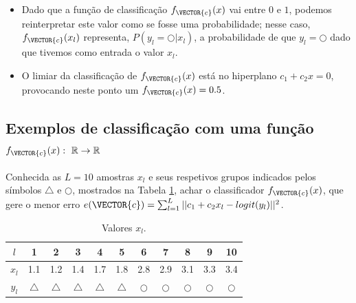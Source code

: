 \begin{tcbattention}
\begin{itemize}
\item Dado que a função de classificação $f_{\VECTOR{c}}(x)$ vai entre $0$ e $1$,
podemos reinterpretar este valor como se fosse uma probabilidade;
nesse caso, $f_{\VECTOR{c}}(x_l)$ representa, $P(y_l=\bigcirc|x_l)$, 
a probabilidade de que $y_l=\bigcirc$ dado que tivemos como entrada o valor $x_l$.
\item O limiar da classificação de $f_{\VECTOR{c}}(x)$ está no hiperplano $c_1  +c_2x=0$,
provocando neste ponto um $f_{\VECTOR{c}}(x)=0.5$.
\end{itemize}
\end{tcbattention}



\subsection{Exemplos de classificação com uma função
$f_{\VECTOR{c}}(x):~\mathbb{R} \rightarrow \mathbb{R}$ }

\begin{example}\label{ex:theo:reglogr1r1}
Conhecida as $L=10$ amostras $x_l$ e seus respetivos grupos indicados pelos símbolos $\bigtriangleup$ e $\bigcirc$, 
mostrados na Tabela \ref{table:theo:reglogr1r1:xn},
achar o classificador $f_{\VECTOR{c}}(x)$, 
que gere o menor erro $e(\VECTOR{c}) =  \sum_{l=1}^{L} ||c_1 +c_2 x_l -logit(y_l)||^2$.
\end{example}


\begin{table}[h!]
\centering
\begin{tabular}{|c||c|c|c|c|c||c|c|c|c|c|} 
 \hline
$l$   & 1 & 2 & 3 & 4 & 5 & 6 & 7 & 8 & 9 & 10 \\ \hline \hline
$x_l$ & 1.1 & 1.2 & 1.4 & 1.7 & 1.8 & 2.8 & 2.9 & 3.1 & 3.3 & 3.4  \\ \hline
$y_l$ & $\bigtriangleup$ & $\bigtriangleup$ & $\bigtriangleup$ & $\bigtriangleup$ & $\bigtriangleup$
      & $\bigcirc$ & $\bigcirc$ & $\bigcirc$ & $\bigcirc$ & $\bigcirc$ \\ \hline
\end{tabular}
\caption{Valores $x_l$.}
\label{table:theo:reglogr1r1:xn}
\end{table}



